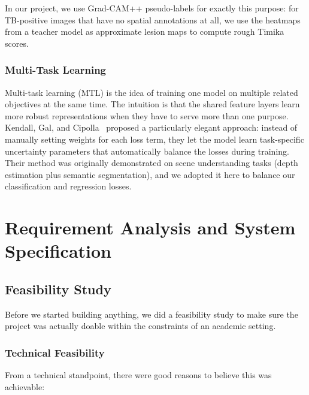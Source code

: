 \documentclass[12pt]{report}
\begin{document}
In our project, we use Grad-CAM++ pseudo-labels for exactly this purpose: for TB-positive images that have no spatial annotations at all, we use the heatmaps from a teacher model as approximate lesion maps to compute rough Timika scores.

\subsection{Multi-Task Learning}
Multi-task learning (MTL) is the idea of training one model on multiple related objectives at the same time. The intuition is that the shared feature layers learn more robust representations when they have to serve more than one purpose. Kendall, Gal, and Cipolla~\cite{ref3} proposed a particularly elegant approach: instead of manually setting weights for each loss term, they let the model learn task-specific uncertainty parameters that automatically balance the losses during training. Their method was originally demonstrated on scene understanding tasks (depth estimation plus semantic segmentation), and we adopted it here to balance our classification and regression losses.

\chapter{Requirement Analysis and System Specification}
\doublespacing

\section{Feasibility Study}

Before we started building anything, we did a feasibility study to make sure the project was actually doable within the constraints of an academic setting.

\subsection{Technical Feasibility}
From a technical standpoint, there were good reasons to believe this was achievable:
\end{document}

